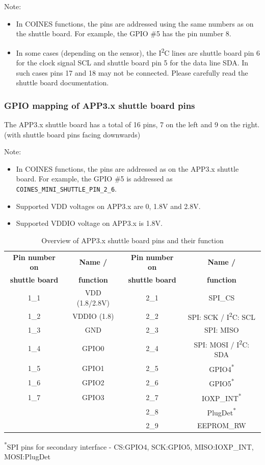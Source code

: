 \documentclass{article}
\begin{document}
Note:
\begin{itemize}
	\item In COINES functions, the pins are addressed using the same numbers as on the shuttle board. For example, the GPIO \#5 has the pin number 8.
	\item In some cases (depending on the sensor), the I\textsuperscript{2}C lines are shuttle board pin 6 for the clock signal SCL and shuttle board pin 5 for the data line SDA. In such cases pins 17 and 18 may not be connected. Please carefully read the shuttle board documentation.
\end{itemize}

\subsubsection{GPIO mapping of APP3.x shuttle board pins}

The APP3.x shuttle board has a total of 16 pins, 7 on the left and 9 on the right. (with shuttle board pins facing downwards)

Note:
\begin{itemize}
	\item In COINES functions, the pins are addressed as on the APP3.x shuttle board. For example, the GPIO \#5 is addressed as \texttt{COINES\_MINI\_SHUTTLE\_PIN\_2\_6}.
	\item Supported VDD voltages on APP3.x are 0, 1.8V and 2.8V.
	\item Supported VDDIO voltage on APP3.x is 1.8V.
\end{itemize}

\begin{table}[H]
	\centering
	\begin{tabular}{|c|c|c|c|}
		\hline
		\textbf{Pin number on} & \textbf{Name /} & \textbf{Pin number on} & \textbf{Name /} \\
		\textbf{shuttle board} & \textbf{function} & \textbf{shuttle board} & \textbf{function} \\
		\hline\hline
		1\_1 & VDD (1.8/2.8V) & 2\_1 & SPI\_CS \\ \hline
		1\_2 & VDDIO (1.8) & 2\_2 & SPI: SCK / I\textsuperscript{2}C: SCL \\ \hline
		1\_3 & GND & 2\_3 & SPI: MISO \\ \hline
		1\_4 & GPIO0 & 2\_4 & SPI: MOSI /  I\textsuperscript{2}C: SDA \\ \hline
		1\_5 & GPIO1 & 2\_5 & GPIO4\textsuperscript{*} \\ \hline
		1\_6 & GPIO2 & 2\_6 & GPIO5\textsuperscript{*} \\ \hline
		1\_7 & GPIO3 & 2\_7 & IOXP\_INT\textsuperscript{*}\\ \hline
		     &       & 2\_8 & PlugDet\textsuperscript{*} \\ \hline
		     &       & 2\_9 & EEPROM\_RW \\ \hline
	\end{tabular}
	\caption{Overview of APP3.x shuttle board pins and their function}
	\label{tab:shtbrdpins}
	\textsuperscript{*}SPI pins for secondary interface - CS:GPIO4, SCK:GPIO5, MISO:IOXP\_INT, MOSI:PlugDet
\end{table}
\end{document}
